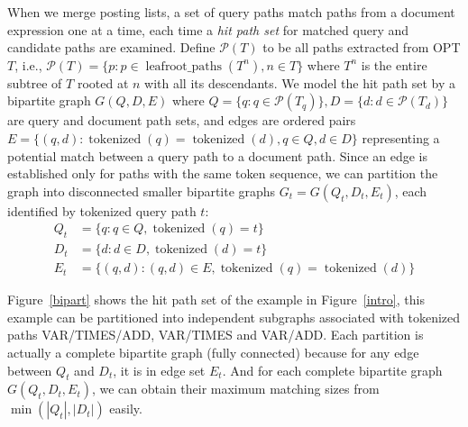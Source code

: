 \documentclass[runningheads]{llncs}
\begin{document}
When we merge posting lists, a set of query paths match paths from a document expression one at a time, each time a \textit{hit path set} for matched query and candidate paths are examined.
%
Define $\mathcal{P}(T)$ to be all paths extracted from OPT $T$, i.e.,
$\mathcal{P}(T) = \{p: p \in \operatorname{leafroot\_paths}(T^n), n \in T\}$ where $T^n$ is the entire subtree of $T$ rooted at $n$ with all its descendants.
%
We model the hit path set by a bipartite graph 
$G(Q, D, E)$ where $Q = \{q: q \in \mathcal{P}(T_q)\}, D = \{d: d \in \mathcal{P}(T_d)\}$ are query and document path sets, and edges are ordered pairs $E = \{(q, d): \operatorname{tokenized}(q) =  \operatorname{tokenized}(d), q \in Q, d \in D\}$ representing a potential match between a query path to a document path.
Since an edge is established only for paths with the same token sequence, we can partition the graph into disconnected smaller bipartite graphs $G_t = G(Q_t, D_t, E_t)$, each identified by tokenized query path $t$:
$$
\begin{aligned}
Q_t &= \{ q: q \in Q, \operatorname{tokenized}(q) = t\} \\
D_t &= \{d: d \in D, \operatorname{tokenized}(d) = t \} \\
E_t &= \{(q, d): (q, d) \in E, \operatorname{tokenized}(q) = \operatorname{tokenized}(d) \}
\end{aligned}
$$

Figure~\ref{bipart} shows the hit path set of the example in Figure~\ref{intro}, this example can be partitioned into independent subgraphs associated with tokenized paths VAR/TIMES/ADD, VAR/TIMES and VAR/ADD.
Each partition is actually a complete bipartite graph (fully connected) because for any edge between $Q_t$ and $D_t$, it is in edge set $E_t$.
And for each complete bipartite graph $G(Q_t, D_t, E_t)$, we can obtain their maximum matching sizes from $\min(|Q_t|, |D_t|)$ easily.
\end{document}

